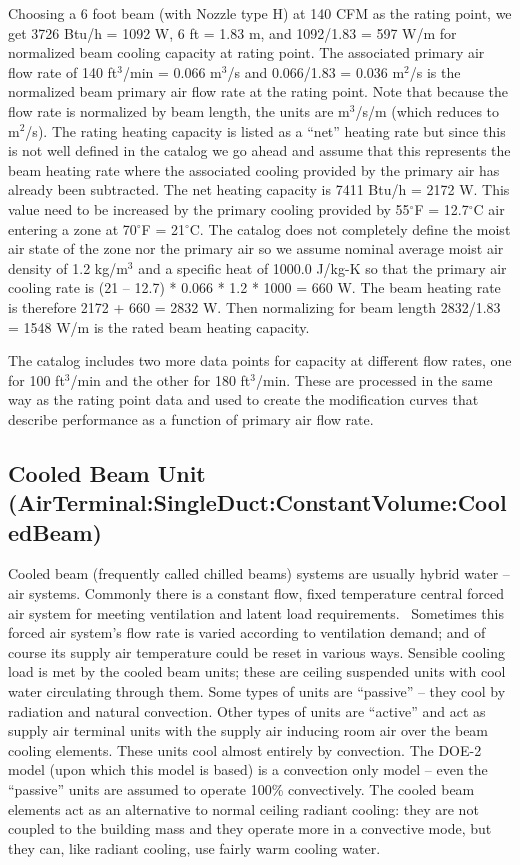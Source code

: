 Choosing a 6 foot beam (with Nozzle type H) at 140 CFM as the rating point, we get 3726 Btu/h = 1092 W, 6 ft = 1.83 m, and 1092/1.83 = 597 W/m for normalized beam cooling capacity at rating point. The associated primary air flow rate of 140 ft\(^{3}\)/min = 0.066 m\(^{3}\)/s and 0.066/1.83 = 0.036 m\(^{2}\)/s is the normalized beam primary air flow rate at the rating point. Note that because the flow rate is normalized by beam length, the units are m\(^{3}\)/s/m (which reduces to m\(^{2}\)/s). The rating heating capacity is listed as a ``net'' heating rate but since this is not well defined in the catalog we go ahead and assume that this represents the beam heating rate where the associated cooling provided by the primary air has already been subtracted. The net heating capacity is 7411 Btu/h = 2172 W. This value need to be increased by the primary cooling provided by 55\(^{\circ}\)F = 12.7\(^{\circ}\)C air entering a zone at 70\(^{\circ}\)F = 21\(^{\circ}\)C. The catalog does not completely define the moist air state of the zone nor the primary air so we assume nominal average moist air density of 1.2 kg/m\(^{3}\) and a specific heat of 1000.0 J/kg-K so that the primary air cooling rate is (21 -- 12.7) * 0.066 * 1.2 * 1000 = 660 W. The beam heating rate is therefore 2172 + 660 = 2832 W. Then normalizing for beam length 2832/1.83 = 1548 W/m is the rated beam heating capacity.

The catalog includes two more data points for capacity at different flow rates, one for 100 ft\(^{3}\)/min and the other for 180 ft\(^{3}\)/min. These are processed in the same way as the rating point data and used to create the modification curves that describe performance as a function of primary air flow rate.

\subsection{Cooled Beam Unit (AirTerminal:SingleDuct:ConstantVolume:CooledBeam)}\label{cooled-beam-unit-airterminalsingleductconstantvolumecooledbeam}

Cooled beam (frequently called chilled beams) systems are usually hybrid water -- air systems. Commonly there is a constant flow, fixed temperature central forced air system for meeting ventilation and latent load requirements.~ Sometimes this forced air system's flow rate is varied according to ventilation demand; and of course its supply air temperature could be reset in various ways. Sensible cooling load is met by the cooled beam units; these are ceiling suspended units with cool water circulating through them. Some types of units are ``passive'' -- they cool by radiation and natural convection. Other types of units are ``active'' and act as supply air terminal units with the supply air inducing room air over the beam cooling elements. These units cool almost entirely by convection. The DOE-2 model (upon which this model is based) is a convection only model -- even the ``passive'' units are assumed to operate 100\% convectively. The cooled beam elements act as an alternative to normal ceiling radiant cooling: they are not coupled to the building mass and they operate more in a convective mode, but they can, like radiant cooling, use fairly warm cooling water.

